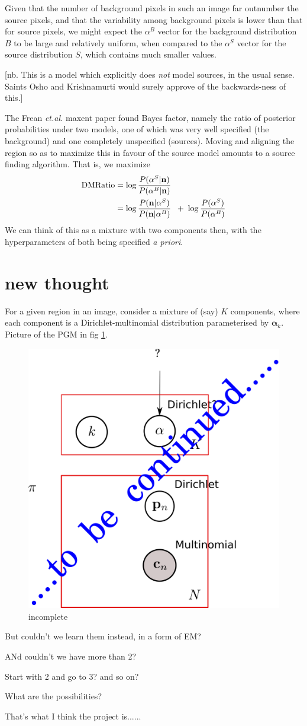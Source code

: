 \documentclass[11pt]{article}
\begin{document}
Given that the number of background pixels in such an image far
outnumber the source pixels, and that the variability among background
pixels is lower than that for source pixels, we might expect the
$\alpha^B$ vector for the background distribution $B$ to be large and
relatively uniform, when compared to the $\alpha^S$ vector for the
source distribution $S$, which contains much smaller values. 

[nb. This is a model which explicitly does {\it not} model sources, in
the usual sense. Saints Osho and Krishnamurti would surely approve of
the backwards-ness of this.]

The Frean {\it et.al.} maxent paper found Bayes factor, namely the
ratio of posterior probabilities under two models, one of which was
very well specified (the background) and one completely unspecified
(sources). Moving and aligning the region so as to maximize this in
favour of the source model amounts to a source finding algorithm. That
is, we maximize
\begin{align}
\text{DMRatio} &= \log \frac{P(\alpha^S | \mathbf{n})}{P(\alpha^B | \mathbf{n})} \label{eq:score} \\
&= \log \frac{P(\mathbf{n} | \alpha^S)}{P(\mathbf{n} | \alpha^B)} \;\; + \; \log \frac{P(\alpha^S)}{P(\alpha^B)}
\end{align}
We can think of this as a mixture with two components then, with the
hyperparameters of both being specified {\it a priori}.

\section{new thought}
For a given region in an image, consider a mixture of (say) $K$
components, where each component is a Dirichlet-multinomial
distribution parameterised by $\boldsymbol{\alpha}_k$.  Picture of the
PGM in fig \ref{fig:mixDirMults}.

\begin{figure}[htb]
\begin{center}
\includegraphics[width=.5\textwidth]{./pics/mix_of_DirMults}
\end{center}
\caption{\label{fig:mixDirMults}
incomplete
}
\end{figure}

But couldn't we learn them instead, in a form of EM?

ANd couldn't we have more than 2?

Start with 2 and go to 3? and so on?

What are the possibilities? 

That's what I think the project is......
\end{document}
